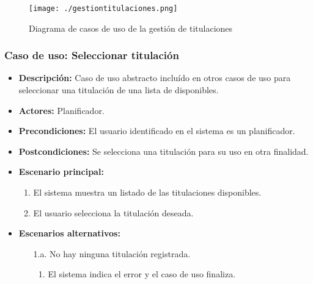\begin{figure}[H] 
  \label{gestion-titulaciones} 
	\begin{center}
    \texttt{[image: ./gestiontitulaciones.png]}
  \end{center}
\caption{Diagrama de casos de uso de la gestión de titulaciones}
\end{figure}
\subsubsection*{Caso de uso: Seleccionar titulación}
\label{select_titulacion}
\begin{itemize}
\item{\bf Descripción:} Caso de uso abstracto incluído en otros casos de uso para seleccionar una titulación de una lista de disponibles.
\item{\bf Actores:} Planificador.
\item{\bf Precondiciones:} El usuario identificado en el sistema es un planificador.
\item{\bf Postcondiciones:} Se selecciona una titulación para su uso en otra finalidad.
\item{\bf Escenario principal:}
\begin{enumerate}
\item El sistema muestra un listado de las titulaciones disponibles.
\item El usuario selecciona la titulación deseada.
\end{enumerate}
\item{\bf Escenarios alternativos:}
\begin{itemize}
\item[1.a.] No hay ninguna titulación registrada.
\begin{enumerate}
\item El sistema indica el error y el caso de uso finaliza.
\end{enumerate}
\end{itemize}
\end{itemize}




